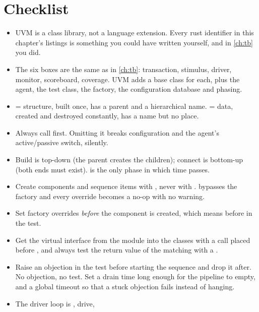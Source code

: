 \section{Checklist}
\label{sec:uvm:checklist}

\begin{itemize}
  \item UVM is a \SV{} class library, not a language extension. Every rust
        identifier in this chapter's listings is something you could have
        written yourself, and in \cref{ch:tb} you did.
  \item The six boxes are the same as in \cref{ch:tb}: transaction, stimulus,
        driver, monitor, scoreboard, coverage. UVM adds a base class for
        each, plus the agent, the test class, the factory, the configuration
        database and phasing.
  \item {} = structure, built once, has a parent and a
        hierarchical name.  = data, created and destroyed
        constantly, has a name but no place.
  \item Always call  first. Omitting it
        breaks configuration and the agent's active/passive switch, silently.
  \item Build is top-down (the parent creates the children); connect is
        bottom-up (both ends must exist).  is the only phase
        in which time passes.
  \item Create components and sequence items with
        , never with .  bypasses the
        factory and every override becomes a no-op with no warning.
  \item Set factory overrides \emph{before} the component is created, which
        means before  in the test.
  \item Get the virtual interface from the module into the classes with
        a  call placed
        before , and always test the return value of
        the matching  with a .
  \item Raise an objection in the test before starting the sequence and drop
        it after. No objection, no test. Set a drain time long enough for the
        \DUT{} pipeline to empty, and a global timeout so that a stuck
        objection fails instead of hanging.
  \item The driver loop is , drive,

\end{itemize}
